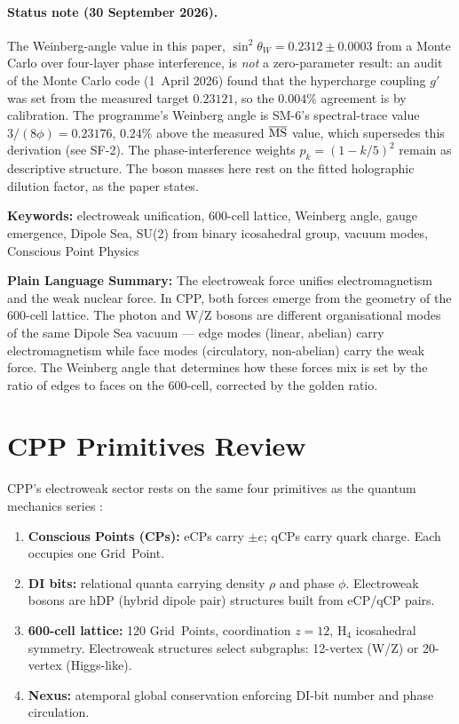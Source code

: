 \documentclass[11pt,letterpaper]{article}
\begin{document}
\paragraph{Status note (30 September 2026).} The Weinberg-angle value in this paper, $\sin^2\theta_W = 0.2312 \pm 0.0003$ from a Monte Carlo over four-layer phase interference, is \emph{not} a zero-parameter result: an audit of the Monte Carlo code (1~April 2026) found that the hypercharge coupling $g'$ was set from the measured target $0.23121$, so the $0.004\%$ agreement is by calibration. The programme's Weinberg angle is SM-6's spectral-trace value $3/(8\phi) = 0.23176$, $0.24\%$ above the measured $\overline{\rm MS}$ value, which supersedes this derivation (see SF-2). The phase-interference weights $p_k = (1-k/5)^2$ remain as descriptive structure. The boson masses here rest on the fitted holographic dilution factor, as the paper states.

\medskip\noindent
\textbf{Keywords:} electroweak unification, 600-cell lattice, Weinberg angle, gauge emergence, Dipole Sea, SU(2) from binary icosahedral group, vacuum modes, Conscious Point Physics

\bigskip\noindent
\textbf{Plain Language Summary:}
The electroweak force unifies electromagnetism and the weak nuclear force. In CPP, both forces emerge from the geometry of the 600-cell lattice. The photon and W/Z bosons are different organisational modes of the same Dipole Sea vacuum --- edge modes (linear, abelian) carry electromagnetism while face modes (circulatory, non-abelian) carry the weak force. The Weinberg angle that determines how these forces mix is set by the ratio of edges to faces on the 600-cell, corrected by the golden ratio.

\bigskip
\raggedright


\tableofcontents
\newpage

\section{CPP Primitives Review}

CPP's electroweak sector rests on the same four primitives as the
quantum mechanics series \citep{cpp2040a}:

\begin{enumerate}
\item \textbf{Conscious Points (CPs):} eCPs carry $\pm e$; qCPs carry
  quark charge.  Each occupies one Grid~Point.
\item \textbf{DI bits:} relational quanta carrying density $\rho$ and
  phase $\phi$.  Electroweak bosons are hDP (hybrid dipole pair)
  structures built from eCP/qCP pairs.
\item \textbf{600-cell lattice:} 120 Grid~Points, coordination $z=12$,
  H$_4$ icosahedral symmetry.  Electroweak structures select
  subgraphs: 12-vertex (W/Z) or 20-vertex (Higgs-like).
\item \textbf{Nexus:} atemporal global conservation enforcing DI-bit
  number and phase circulation.
\end{enumerate}
\end{document}
